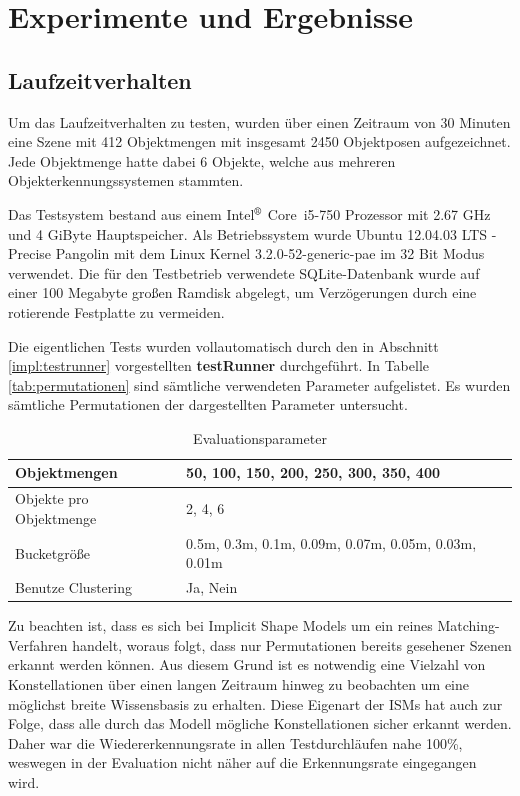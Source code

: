 \chapter{Experimente und Ergebnisse}\label{ch:evaluation}

\section{Laufzeitverhalten}

Um das Laufzeitverhalten zu testen, wurden über einen Zeitraum von 30 Minuten eine Szene mit 412 Objektmengen mit insgesamt 2450 Objektposen aufgezeichnet.
Jede Objektmenge hatte dabei 6 Objekte, welche aus mehreren Objekterkennungssystemen stammten.

Das Testsystem bestand aus einem Intel$^\text{\textregistered}$ Core\texttrademark\ i5-750 Prozessor mit 2.67 GHz und 4 GiByte Hauptspeicher.
Als Betriebssystem wurde Ubuntu 12.04.03 LTS - Precise Pangolin mit dem Linux Kernel 3.2.0-52-generic-pae im 32 Bit Modus verwendet.
Die für den Testbetrieb verwendete SQLite-Datenbank wurde auf einer 100 Megabyte großen Ramdisk abgelegt, um Verzögerungen durch eine rotierende Festplatte zu vermeiden.

Die eigentlichen Tests wurden vollautomatisch durch den in Abschnitt \vref{impl:testrunner} vorgestellten \textbf{testRunner} durchgeführt.
In Tabelle \vref{tab:permutationen} sind sämtliche verwendeten Parameter aufgelistet.
Es wurden sämtliche Permutationen der dargestellten Parameter untersucht.

\begin{table}
\caption{Evaluationsparameter}
\label{tab:permutationen}
\begin{tabularx}{\textwidth}{ |l|X| }
 \hline
 Objektmengen & 50, 100, 150, 200, 250, 300, 350, 400 \\
 \hline
 Objekte pro Objektmenge & 2, 4, 6 \\
 \hline
 Bucketgröße & 0.5m, 0.3m, 0.1m, 0.09m, 0.07m, 0.05m, 0.03m, 0.01m \\
 \hline
 Benutze Clustering & Ja, Nein \\
 \hline
\end{tabularx}

\end{table}

Zu beachten ist, dass es sich bei Implicit Shape Models um ein reines Matching-Verfahren handelt, woraus folgt, dass nur Permutationen bereits gesehener Szenen erkannt werden können.
Aus diesem Grund ist es notwendig eine Vielzahl von Konstellationen über einen langen Zeitraum hinweg zu beobachten um eine möglichst breite Wissensbasis zu erhalten.
Diese Eigenart der ISMs hat auch zur Folge, dass alle durch das Modell mögliche Konstellationen sicher erkannt werden.
Daher war die Wiedererkennungsrate in allen Testdurchläufen nahe 100\%, weswegen in der Evaluation nicht näher auf die Erkennungsrate eingegangen wird.

